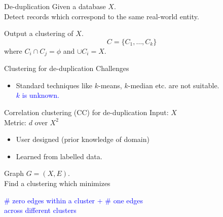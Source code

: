 \documentclass{beamer}
\begin{document}
\begin{frame}{De-duplication}
	\onslide<1->
    Given a database $X$. \\
    \vspace{10pt}Detect records which correspond to the same real-world entity.
    
    \vspace{30pt}Output a clustering of $X$.
    $$C = \{C_1, \ldots, C_k \}$$
    where $C_i \cap C_j = \phi$ and $\cup C_i = X$.
\end{frame}

\begin{frame}{Clustering for de-duplication}
	Challenges\\
    \begin{itemize}
    	\vspace{20pt}\item Standard techniques like $k$-means, $k$-median etc. are not suitable.\\
    	\textcolor{blue}{$k$ is unknown.}
	\end{itemize}    	
\end{frame}

\begin{frame}{Correlation clustering (CC) for de-duplication}
	Input: $X$\\
	Metric: $d$ over $X^2$\\
	\begin{itemize}
		\item User designed (prior knowledge of domain) 
		\item Learned from labelled data.
	\end{itemize}
	 
	\vspace{20pt}Graph $G = (X, E)$. \\
    \vspace{10pt}Find a clustering which minimizes
    
    \begin{center}
    \textcolor{blue}{\# zero edges within a cluster + \# one edges\\ across different clusters}
    \end{center}
    
\end{frame}
\end{document}

